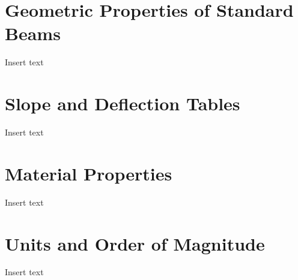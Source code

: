 \documentclass[
  letterpaper,
  DIV=11,
  numbers=noendperiod]{scrreprt}
\begin{document}
\cleardoublepage
{}
{}
\appendix

\chapter{Geometric Properties of Standard
Beams}\label{geometric-properties-of-standard-beams}

Insert text

\chapter{Slope and Deflection Tables}\label{slope-and-deflection-tables}

Insert text

\chapter{Material Properties}\label{material-properties}

Insert text

\chapter{Units and Order of
Magnitude}\label{units-and-order-of-magnitude}

Insert text
\end{document}
